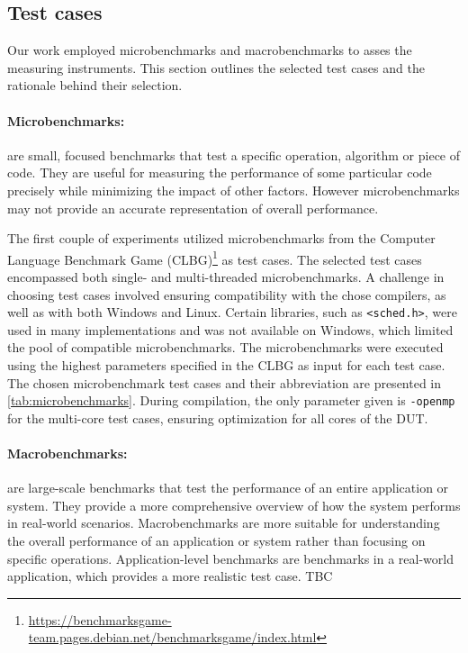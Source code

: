 \subsection{Test cases}\label{subsec:test_cases}

Our work employed microbenchmarks and macrobenchmarks to asses the measuring instruments. This section outlines the selected test cases and the rationale behind their selection.

\paragraph{Microbenchmarks:} are small, focused benchmarks that test a specific operation, algorithm or piece of code. They are useful for measuring the performance of some particular code precisely while minimizing the impact of other factors. However microbenchmarks may not provide an accurate representation of overall performance.\cite{MicroVSMacro}

The first couple of experiments utilized microbenchmarks from the Computer Language Benchmark Game (CLBG)\footnote{\url{https://benchmarksgame-team.pages.debian.net/benchmarksgame/index.html}} as test cases. The selected test cases encompassed both single- and multi-threaded microbenchmarks. A challenge in choosing test cases involved ensuring compatibility with the chose compilers, as well as with both Windows and Linux. Certain libraries, such as \texttt{<sched.h>}, were used in many implementations and was not available on Windows, which limited the pool of compatible microbenchmarks. The microbenchmarks were executed using the highest parameters specified in the CLBG as input for each test case. The chosen microbenchmark test cases and their abbreviation are presented in \cref{tab:microbenchmarks}. During compilation, the only parameter given is \texttt{-openmp} for the multi-core test cases, ensuring optimization for all cores of the DUT.



\paragraph{Macrobenchmarks:} are large-scale benchmarks that test the performance of an entire application or system. They provide a more comprehensive overview of how the system performs in real-world scenarios. Macrobenchmarks are more suitable for understanding the overall performance of an application or system rather than focusing on specific operations.\cite{MicroVSMacro} Application-level benchmarks are benchmarks in a real-world application, which provides a more realistic test case. TBC
